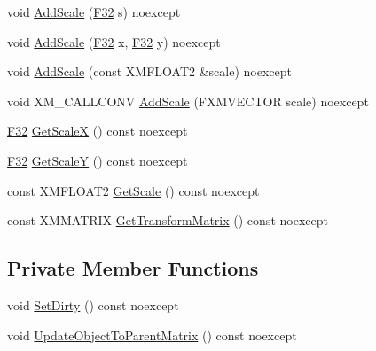 \begin{DoxyCompactItemize}
\item 
void \hyperlink{classmage_1_1_sprite_transform_a44dd155f58f2ebdb7e44a366933863fa}{Add\+Scale} (\hyperlink{namespacemage_aa97e833b45f06d60a0a9c4fc22ae02c0}{F32} s) noexcept
\item 
void \hyperlink{classmage_1_1_sprite_transform_a72cebc3612bc3ea91989234fb8fb03d2}{Add\+Scale} (\hyperlink{namespacemage_aa97e833b45f06d60a0a9c4fc22ae02c0}{F32} x, \hyperlink{namespacemage_aa97e833b45f06d60a0a9c4fc22ae02c0}{F32} y) noexcept
\item 
void \hyperlink{classmage_1_1_sprite_transform_aed6471e3e51cafe1a2f4651b0f1f4456}{Add\+Scale} (const X\+M\+F\+L\+O\+A\+T2 \&scale) noexcept
\item 
void X\+M\+\_\+\+C\+A\+L\+L\+C\+O\+NV \hyperlink{classmage_1_1_sprite_transform_a9064eb670f25dbcd6937971b9ccaadda}{Add\+Scale} (F\+X\+M\+V\+E\+C\+T\+OR scale) noexcept
\item 
\hyperlink{namespacemage_aa97e833b45f06d60a0a9c4fc22ae02c0}{F32} \hyperlink{classmage_1_1_sprite_transform_af82246da3228dfc1588ca806ddf6315f}{Get\+ScaleX} () const noexcept
\item 
\hyperlink{namespacemage_aa97e833b45f06d60a0a9c4fc22ae02c0}{F32} \hyperlink{classmage_1_1_sprite_transform_a07010f5d7e781ca641456b18fd16e67f}{Get\+ScaleY} () const noexcept
\item 
const X\+M\+F\+L\+O\+A\+T2 \hyperlink{classmage_1_1_sprite_transform_ac62a9a5b40abbbb40398885010990e55}{Get\+Scale} () const noexcept
\item 
const X\+M\+M\+A\+T\+R\+IX \hyperlink{classmage_1_1_sprite_transform_a4e5d58a02d951c021e3e41e4ac183d0d}{Get\+Transform\+Matrix} () const noexcept
\end{DoxyCompactItemize}
\subsection*{Private Member Functions}
\begin{DoxyCompactItemize}
\item 
void \hyperlink{classmage_1_1_sprite_transform_ab76e0ca7d8f4e37a8a6f58a7a9face17}{Set\+Dirty} () const noexcept
\item 
void \hyperlink{classmage_1_1_sprite_transform_a92ae51f7dbf034d119625f70aa7fad1c}{Update\+Object\+To\+Parent\+Matrix} () const noexcept
\end{DoxyCompactItemize}
